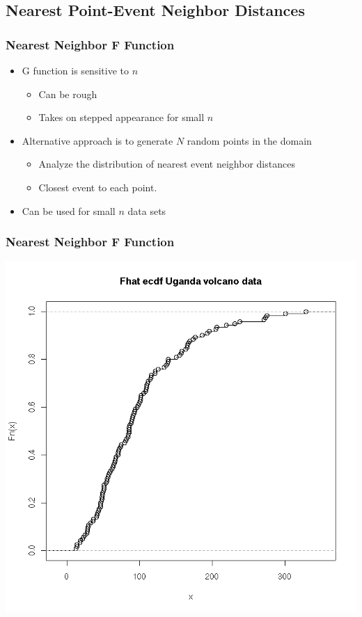 \documentclass[nototal,handout]{beamer}
\begin{document}
\subsection{Nearest Point-Event Neighbor Distances}

\begin{frame}[<+->]
    \frametitle{Nearest Neighbor F Function}
    \begin{itemize}
      \item G function is sensitive to $n$
	\begin{itemize}
	  \item Can be rough
	  \item Takes on stepped appearance for small $n$
	\end{itemize}
      \item Alternative approach is to generate $N$ random points in the
	domain
	\begin{itemize}
	  \item Analyze the distribution of nearest event neighbor distances
	  \item Closest event to each point.
	\end{itemize}
      \item Can be used for small $n$ data sets
    \end{itemize}
  \end{frame}


\begin{frame}[<+->]
    \frametitle{Nearest Neighbor F Function}
    \begin{center}
      \includegraphics[width=.65\linewidth]{nnf.png}
    \end{center}
  \end{frame}
\end{document}
